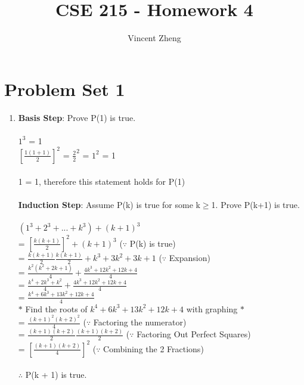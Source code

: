 \documentclass[12pt]{article}
\author{Vincent Zheng}
\begin{document}
\title{CSE 215 - Homework 4}
\maketitle

\section*{Problem Set 1}
\begin{enumerate}[label = (\alph*)]
    \item

        \textbf{Basis Step}: Prove P(1) is true. \\
        \\
        $1^3$ = 1 \\
        $[\frac{1(1+1)}{2}]^2$ = $\frac{2}{2}^2$ = $1^2$ = 1 \\
        \\
        1 = 1, therefore this statement holds for P(1)\\
        \\
        \textbf{Induction Step}: Assume P(k) is true for some k$\geq$1. Prove P(k+1)
                                 is true. \\
        \\
        $(1^3 + 2^3 + ... + k^3) + (k + 1)^3$ \\
        = $[\frac{k(k+1)}{2}]^2 + (k + 1)^3$ \hspace{3em} ($\because$ P(k) is true) \\
        = $\frac{k(k+1)}{2} \frac{k(k+1)}{2} + k^3 + 3k^2 + 3k + 1$ ($\because$ Expansion) \\
        = $\frac{k^2 (k^2 + 2k + 1)}{4} + \frac{4k^3 + 12k^2 + 12k + 4}{4}$ \\
        = $\frac{k^4 + 2k^3 + k^2}{4} + \frac{4k^3 + 12k^2 + 12k + 4}{4}$ \\
        = $\frac{k^4 + 6k^3 + 13k^2 + 12k + 4}{4}$ \\
        $\ast$ Find the roots of $k^4 + 6k^3 + 13k^2 + 12k + 4$ with graphing $\ast$ \\
        = $\frac{(k + 1)^2 (k + 2)^2}{4}$ \hspace{3em} ($\because$ Factoring the numerator)\\
        = $\frac{(k + 1) (k + 2)}{2}\frac{(k + 1) (k + 2)}{2}$ \hspace{3em} ($\because$
            Factoring Out Perfect Squares)\\
        = $[\frac{(k + 1)(k + 2)}{4}]^2$  \hspace{3em} ($\because$ Combining the 2 Fractions) \\
        \\
        $\therefore$ P(k + 1) is true. \\


\end{enumerate}
\end{document}
